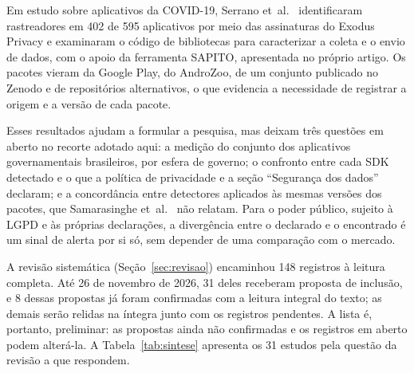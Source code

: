 Em estudo sobre aplicativos da COVID-19, Serrano et~al.~\cite{serrano2024} identificaram rastreadores em 402 de 595 aplicativos por meio das assinaturas do Exodus Privacy e examinaram o código de bibliotecas para caracterizar a coleta e o envio de dados, com o apoio da ferramenta SAPITO, apresentada no próprio artigo. Os pacotes vieram da Google Play, do AndroZoo, de um conjunto publicado no Zenodo e de repositórios alternativos, o que evidencia a necessidade de registrar a origem e a versão de cada pacote.

Esses resultados ajudam a formular a pesquisa, mas deixam três questões em aberto no recorte adotado aqui: a medição do conjunto dos aplicativos governamentais brasileiros, por esfera de governo; o confronto entre cada SDK detectado e o que a política de privacidade e a seção ``Segurança dos dados'' declaram; e a concordância entre detectores aplicados às mesmas versões dos pacotes, que Samarasinghe et~al.~\cite{samarasinghe2022} não relatam. Para o poder público, sujeito à LGPD e às próprias declarações, a divergência entre o declarado e o encontrado é um sinal de alerta por si só, sem depender de uma comparação com o mercado.

\label{sec:ref-sintese}

A revisão sistemática (Seção~\ref{sec:revisao}) encaminhou 148 registros à leitura completa. Até 26 de novembro de 2026, 31 deles receberam proposta de inclusão, e 8 dessas propostas já foram confirmadas com a leitura integral do texto; as demais serão relidas na íntegra junto com os registros pendentes. A lista é, portanto, preliminar: as propostas ainda não confirmadas e os registros em aberto podem alterá-la. A Tabela~\ref{tab:sintese} apresenta os 31 estudos pela questão da revisão a que respondem.

